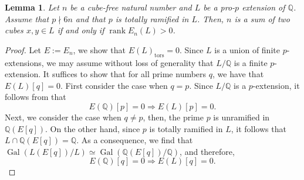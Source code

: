 \documentclass[11pt]{amsart}
\newtheorem{lemma}[theorem]{Lemma}
\newcommand{\Q}{\mathbb{Q}}
\newcommand{\op}[1]{\operatorname{#1}}
\numberwithin{equation}{section}
\begin{document}
\begin{lemma}\label{lemma 2.1}
    Let $n$ be a cube-free natural number and $L$ be a pro-$p$ extension of $\Q$. 
    Assume that $p\nmid 6n$ and that $p$ is totally ramified in $L$. Then, $n$ is a sum of two cubes $x, y\in L$ if and only if $\op{rank} E_n(L)>0$.
\end{lemma}
\begin{proof}
    Let $E:=E_n$, we show that $E(L)_{\op{tors}}=0$. Since $L$ is a union of finite $p$-extensions, we may assume without loss of generality that $L/\Q$ is a finite $p$-extension. It suffices to show that for all prime numbers $q$, we have that $E(L)[q]=0$. First consider the case when $q=p$. Since $L/\Q$ is a $p$-extension, it follows from \cite[Proposition 1.6.12]{NSW} that
    \[E(\Q)[p]=0\Rightarrow E(L)[p]=0.\]
    Next, we consider the case when $q\neq p$, then, the prime $p$ is unramified in $\Q(E[q])$. On the other hand, since $p$ is totally ramified in $L$, it follows that $L\cap \Q(E[q])=\Q$. As a consequence, we find that $\op{Gal}(L(E[q])/L)\simeq \op{Gal}(\Q(E[q])/\Q)$, and therefore, 
    \[E(\Q)[q]=0\Rightarrow E(L)[q]=0.\]
\end{proof}
\end{document}

